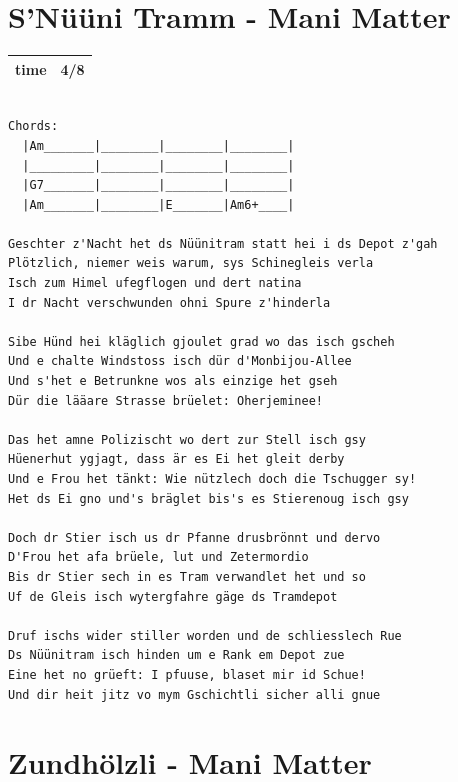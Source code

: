 \documentclass[
]{book}
\let\stdsection\section
\renewcommand\section{\clearpage\stdsection}
\begin{document}
\hypertarget{snuxfcuxfcni-tramm---mani-matter}{%
\section{S'Nüüni Tramm - Mani Matter}\label{snuxfcuxfcni-tramm---mani-matter}}

\begin{longtable}[]{@{}ll@{}}
\toprule
\endhead
time & 4/8\tabularnewline
\bottomrule
\end{longtable}

\begin{verbatim}

Chords:
  |Am_______|________|________|________|
  |_________|________|________|________|
  |G7_______|________|________|________|
  |Am_______|________|E_______|Am6+____|

Geschter z'Nacht het ds Nüünitram statt hei i ds Depot z'gah
Plötzlich, niemer weis warum, sys Schinegleis verla
Isch zum Himel ufegflogen und dert natina
I dr Nacht verschwunden ohni Spure z'hinderla

Sibe Hünd hei kläglich gjoulet grad wo das isch gscheh
Und e chalte Windstoss isch dür d'Monbijou-Allee
Und s'het e Betrunkne wos als einzige het gseh
Dür die lääare Strasse brüelet: Oherjeminee!

Das het amne Polizischt wo dert zur Stell isch gsy
Hüenerhut ygjagt, dass är es Ei het gleit derby
Und e Frou het tänkt: Wie nützlech doch die Tschugger sy!
Het ds Ei gno und's bräglet bis's es Stierenoug isch gsy

Doch dr Stier isch us dr Pfanne drusbrönnt und dervo
D'Frou het afa brüele, lut und Zetermordio
Bis dr Stier sech in es Tram verwandlet het und so
Uf de Gleis isch wytergfahre gäge ds Tramdepot

Druf ischs wider stiller worden und de schliesslech Rue
Ds Nüünitram isch hinden um e Rank em Depot zue
Eine het no grüeft: I pfuuse, blaset mir id Schue!
Und dir heit jitz vo mym Gschichtli sicher alli gnue

\end{verbatim}

\hypertarget{zundhuxf6lzli---mani-matter}{%
\section{Zundhölzli - Mani Matter}\label{zundhuxf6lzli---mani-matter}}
\end{document}
